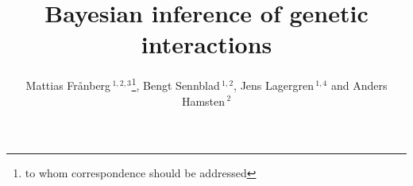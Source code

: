 \documentclass{bioinfo}
\begin{document}

\title[Bayesian inference of genetic interactions]{Bayesian inference of genetic interactions}
\author[Fr\aa nberg \textit{et~al}]{Mattias Fr\aa nberg\,$^{1,2,3}$\footnote{to whom correspondence should be addressed}, Bengt Sennblad\,$^{1,2}$, Jens Lagergren\,$^{1,4}$ and Anders Hamsten\,$^2$}
\address{$^{1}$Science for Life Laboratory, Stockholm University, SE-17121, Solna\\
$^{2}$Atherosclerosis Research Unit, Department of Medicine, Karolinska Institutet, SE-171 77, Stockholm,\\
$^{3}$Department of Numerical Analysis and Computer Science, Stockholm University, SE-100 44, Stockholm,\\
$^{4}$School of Computer Science and Communications, KTH Royal Institute of Technology, SE-100 44, Stockholm, Sweden}



\maketitle




\end{document}
